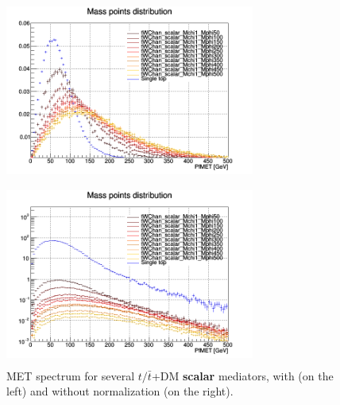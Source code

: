 \documentclass[a4paper, 10pt, openright]{report}
\begin{document}
\begin{figure}[htbp]
\centering
\begin{minipage}[b]{.49\textwidth}
\includegraphics[width=8.2cm, height=6cm]{figs/singleTopScalarMETNorm.png}
\end{minipage}\hfill
\begin{minipage}[b]{.49\textwidth}
\includegraphics[width=8.2cm, height=6cm]{figs/singleTopScalarMET.png}
\end{minipage} \hfill
\caption{\ac{MET} spectrum for several $t/\bar t$+DM \textbf{scalar} mediators, with (on the left) and without normalization (on the right).}
\label{fig:signalSingleScalar}
\end{figure}
\end{document}
